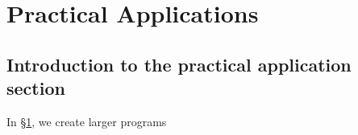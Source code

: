 \documentclass{article}
\begin{document}


\section{Practical Applications} \label{sec:practical}

\subsection{Introduction to the practical application section}


In \S \ref{sec:practical}, we create larger programs


\end{document}
